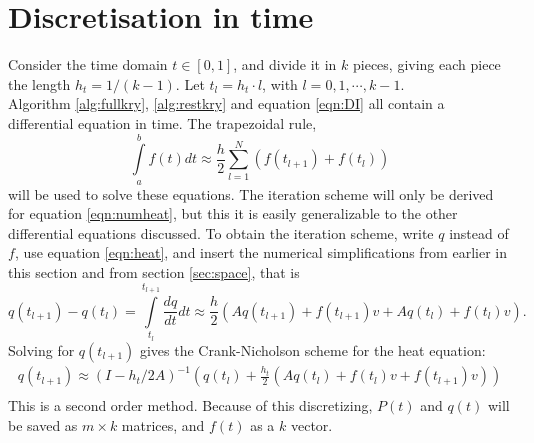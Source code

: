 \section{Discretisation in time} \label{sec:time}
Consider the time domain $t \in [0,1] $, and divide it in $k$ pieces, giving each piece the length $h_t = 1/(k-1)$. Let $t_l = h_t\cdot l$, with $l = 0,1,\cdots,k-1 $.\\

Algorithm \ref{alg:fullkry}, \ref{alg:restkry} and equation \ref{eqn:DI} all contain a differential equation in time.
The trapezoidal rule\cite{trap}, 
\begin{equation} \label{eqn:trap}
\int \limits_a^b f(t) dt \approx \frac{h}{2} \sum \limits_{l = 1}^N(f(t_{l+1})+f(t_l))
\end{equation}
will be used to solve these equations. 
The iteration scheme will only be derived for equation \eqref{eqn:numheat}, but 
this it is easily generalizable to the other differential equations discussed.
To obtain the iteration scheme, write $q$ instead of $f$, use equation \eqref{eqn:heat}, and insert the numerical simplifications from earlier in this section and from section \ref{sec:space}, that is
\begin{equation}
q(t_{l+1}) - q(t_l) = \int \limits_{t_l}^{t_{l+1}} \frac{d q}{d t} dt \approx \frac{h}{2}(A q(t_{l+1})+f(t_{l+1})v +A q(t_l)+f(t_l) v) .
\end{equation}
Solving for $q(t_{l+1})$ gives the Crank-Nicholson scheme for the heat equation:
\begin{equation} \label{eqn:trapscheme}
\begin{aligned}
q(t_{l+1}) \approx (I-h_t/2 A)^{-1}(q(t_l) + \frac{h_t}{2}( A q(t_{l}) + f(t_l)v+f(t_{l+1})v))\\
\end{aligned}
\end{equation} 
This is a second order method.
Because of this discretizing, $P(t)$ and $q(t)$ will be saved as $m \times k $ matrices, and $f(t)$ as a $k$ vector.

